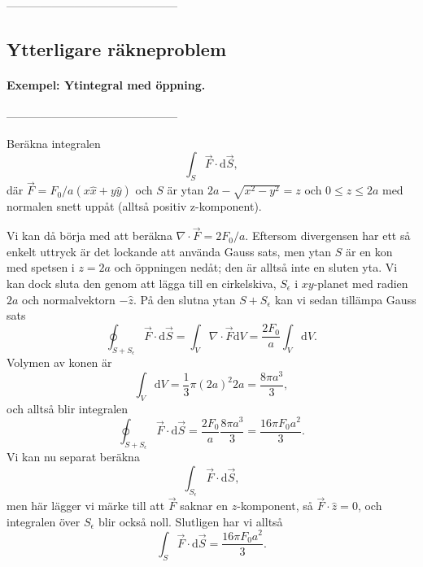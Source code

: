 \documentclass[%
oneside,                 %
final,                   %
10pt]{article}
\begin{document}
\noindent
---------------------------------------------

\subsection{Ytterligare räkneproblem}

\paragraph{Exempel: Ytintegral med öppning.}
---------------------------------------------

Beräkna integralen
\begin{equation}
\int_S \vec{F} \cdot \mbox{d}\vec{S},
\end{equation}
där $\vec{F} = F_0/a \left( x\hat{x} + y\hat{y} \right)$ och $S$ är ytan $2a -\sqrt{x^2 - y^2} = z$ och $0\le z \le 2a$ med normalen snett uppåt (alltså positiv z-komponent).

Vi kan då börja med att beräkna $\nabla \cdot \vec{F} = 2F_0/a$. Eftersom divergensen har ett så enkelt uttryck är det lockande att  använda Gauss sats, men ytan $S$ är en kon med spetsen i $z = 2a$ och öppningen nedåt; den är alltså inte en sluten yta.  Vi kan dock sluta den genom att lägga till en cirkelskiva, $S_\epsilon$ i $xy$-planet med radien $2a$ och normalvektorn $-\hat{z}$. På den slutna ytan $S+S_\epsilon$ kan vi sedan tillämpa Gauss sats
\begin{equation}
  \oint_{S+S_\epsilon} \vec{F} \cdot \mbox{d}\vec{S} = \int_V \nabla \cdot \vec{F}
\mbox{d}V = \frac{2F_0}{a}\int_V\mbox{d}V.
\end{equation}
Volymen av konen är
\begin{equation}
  \int_V\mbox{d}V = \frac{1}{3} \pi \left(2a\right)^2 2a = \frac{8\pi a^3}{3},
\end{equation}
och alltså blir integralen
\begin{equation}
  \oint_{S+S_\epsilon} \vec{F} \cdot \mbox{d}\vec{S} = \frac{2F_0}{a} 
\frac{8\pi a^3}{3} = \frac{16\pi F_0 a^2}{3}.
\end{equation}
Vi kan nu separat beräkna
\begin{equation}
  \int_{S_\epsilon} \vec{F} \cdot \mbox{d}\vec{S},
\end{equation}
men här lägger vi märke till att $\vec{F}$ saknar en $z$-komponent,  så $\vec{F} \cdot \hat{z} = 0$, och integralen över $S_\epsilon$ blir också noll.  Slutligen har vi alltså 
\begin{equation}
  \int_S \vec{F} \cdot \mbox{d}\vec{S} = \frac{16\pi F_0 a^2}{3}.
\end{equation}
\end{document}

